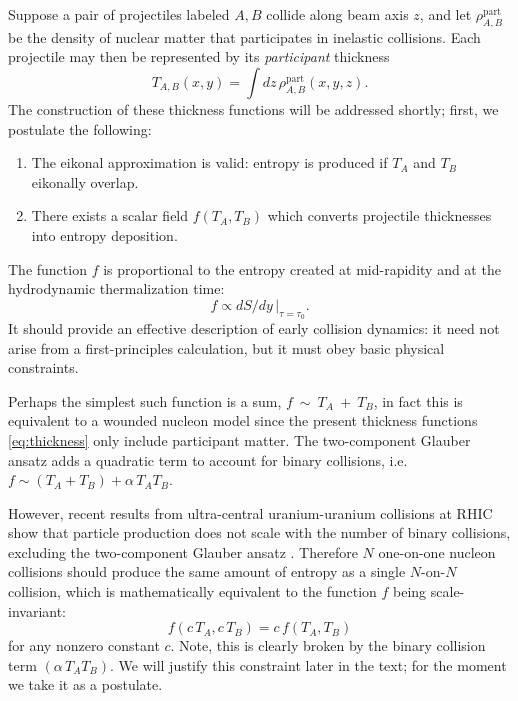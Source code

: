 \documentclass[aps,prc,reprint,amsmath]{revtex4-1}
\begin{document}
Suppose a pair of projectiles labeled $A, B$ collide along beam axis $z$, and let $\rho^\text{part}_{A,B}$ be the density of nuclear matter that participates in inelastic collisions.
Each projectile may then be represented by its \emph{participant} thickness
\begin{equation}
  T_{A,B}(x, y) = \int dz \, \rho^\text{part}_{A,B}(x, y, z).
  \label{eq:thickness}
\end{equation}
The construction of these thickness functions will be addressed shortly; first, we postulate the following:
\begin{enumerate}
  \item The eikonal approximation is valid:  entropy is produced if $T_A$ and $T_B$ eikonally overlap.
  \item There exists a scalar field $f(T_A, T_B)$ which converts projectile thicknesses into entropy
    deposition.
\end{enumerate}
The function $f$ is proportional to the entropy created at mid-rapidity and at the hydrodynamic thermalization
time:
\begin{equation}
  f \propto dS/dy \, |_{\tau = \tau_0}.
\end{equation}
It should provide an effective description of early collision dynamics:
it need not arise from a first-principles calculation, but it must obey basic physical constraints.

Perhaps the simplest such function is a sum, $f~\sim~T_A~+~T_B$, in fact this is equivalent to a wounded nucleon model since the present thickness functions \eqref{eq:thickness} only include participant matter.
The two-component Glauber ansatz adds a quadratic term to account for binary collisions, i.e.\ $f \sim (T_A + T_B) + \alpha \, T_A T_B$.

However, recent results from ultra-central uranium-uranium collisions at RHIC \cite{FortheSTAR:2013bza,Wang:2014qxa} show that particle production does not scale with the number of binary collisions, excluding the two-component Glauber ansatz \cite{Goldschmidt:2015qya}.
Therefore $N$ \mbox{one-on-one} nucleon collisions should produce the same amount of entropy as a single \mbox{$N$-on-$N$} collision, which is mathematically equivalent to the function $f$ being scale-invariant:
\begin{equation}
  f(c \, T_A, c \, T_B) = c \, f(T_A, T_B)
  \label{eq:scale-inv}
\end{equation}
for any nonzero constant $c$.
Note, this is clearly broken by the binary collision term $(\alpha \, T_A T_B)$.
We will justify this constraint later in the text; for the moment we take it as a postulate.
\end{document}
